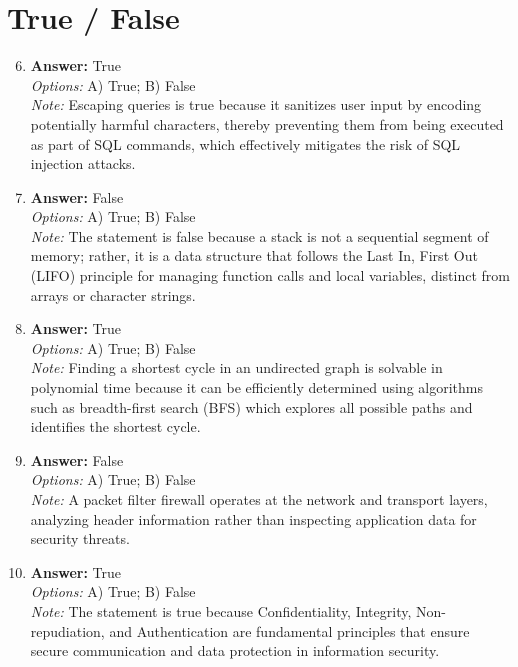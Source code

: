 \documentclass[12pt]{article}
\begin{document}
\section*{True / False}
\begin{enumerate}[label=\arabic*.]
\setcounter{enumi}{5}
\item \textbf{Answer:} True
\\ \textit{Options:} A) True; B) False
\\ \textit{Note:} Escaping queries is true because it sanitizes user input by encoding potentially harmful characters, thereby preventing them from being executed as part of SQL commands, which effectively mitigates the risk of SQL injection attacks.
\item \textbf{Answer:} False
\\ \textit{Options:} A) True; B) False
\\ \textit{Note:} The statement is false because a stack is not a sequential segment of memory; rather, it is a data structure that follows the Last In, First Out (LIFO) principle for managing function calls and local variables, distinct from arrays or character strings.
\item \textbf{Answer:} True
\\ \textit{Options:} A) True; B) False
\\ \textit{Note:} Finding a shortest cycle in an undirected graph is solvable in polynomial time because it can be efficiently determined using algorithms such as breadth-first search (BFS) which explores all possible paths and identifies the shortest cycle.
\item \textbf{Answer:} False
\\ \textit{Options:} A) True; B) False
\\ \textit{Note:} A packet filter firewall operates at the network and transport layers, analyzing header information rather than inspecting application data for security threats.
\item \textbf{Answer:} True
\\ \textit{Options:} A) True; B) False
\\ \textit{Note:} The statement is true because Confidentiality, Integrity, Non-repudiation, and Authentication are fundamental principles that ensure secure communication and data protection in information security.
\end{enumerate}
\end{document}
